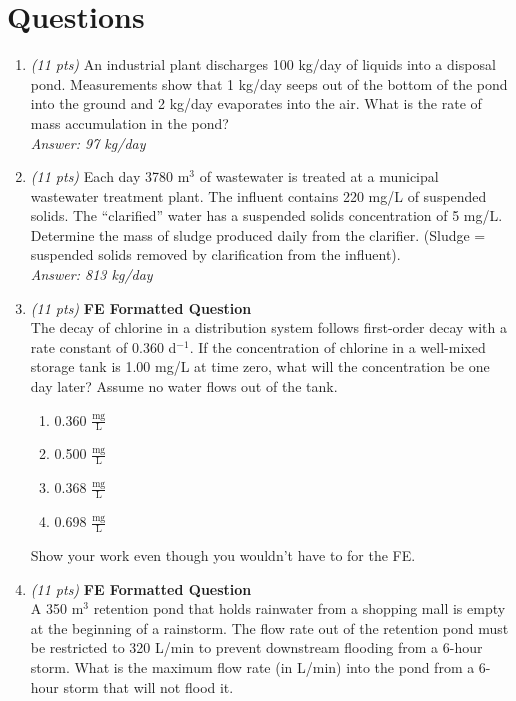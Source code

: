 \documentclass[12pt,letterpaper]{article}
\begin{document}
\section *{Questions}
\begin{enumerate}
\item \emph{(11 pts)} An industrial plant discharges 100 kg/day of liquids into a disposal pond.  Measurements show that 1 kg/day seeps out of the bottom of the pond into the ground and 2 kg/day evaporates into the air.  What is the rate of mass accumulation in the pond?\\
\emph{Answer: 97 kg/day} 

\item 	\emph{(11 pts)} Each day 3780 m$^3$ of wastewater is treated at a municipal wastewater treatment plant.  The influent contains 220 mg/L of suspended solids.  The “clarified” water has a suspended solids concentration of 5 mg/L.  Determine the mass of sludge produced daily from the clarifier. (Sludge = suspended solids removed by clarification from the influent).
\\
\emph{Answer: 813 kg/day}  

\item \emph{(11 pts)} \textbf{FE Formatted Question}\\
The decay of chlorine in a distribution system follows first-order decay with a rate constant of 0.360 d$^{-1}$.  If the concentration of chlorine in a well-mixed storage tank is 1.00 mg/L at time zero, what will the concentration be one day later? Assume no water flows out of the tank.

\begin{enumerate}
\item 0.360 $\mathrm{\frac{mg}{L}}$
\item 0.500 $\mathrm{\frac{mg}{L}}$
\item 0.368 $\mathrm{\frac{mg}{L}}$
\item 0.698 $\mathrm{\frac{mg}{L}}$
\end{enumerate}
Show your work even though you wouldn't have to for the FE.

\item \emph{(11 pts)} \textbf{FE Formatted Question}\\
A 350 $\mathrm{m^3}$ retention pond that holds rainwater from a shopping mall is empty at the beginning of a rainstorm.  The flow rate out of the retention pond must be restricted to 320 L/min to prevent downstream flooding from a 6-hour storm.  What is the maximum flow rate (in L/min) into the pond from a 6-hour storm that will not flood it.


\end{enumerate}
\end{document}
